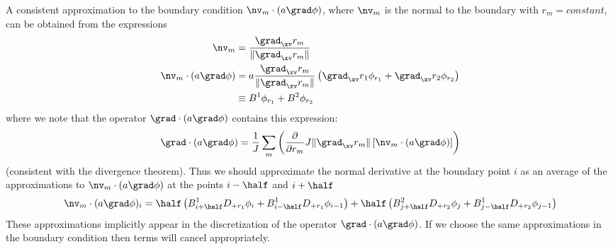 A consistent approximation to the boundary condition $\nv_m\cdot(a\grad \phi)$, where $\nv_m$ is
the normal to the boundary with  $r_m=constant$, can be obtained from the expressions
\begin{align*}
   \nv_m &= {\grad_\xv r_m \over \|\grad_\xv r_m \|} \\
   \nv_m\cdot(a\grad \phi) &= a {\grad_\xv r_m \over \|\grad_\xv r_m \|} 
        \left( \grad_\xv r_1 \phi_{r_1} + \grad_\xv r_2 \phi_{r_2} \right) \\
         &\equiv B^1 \phi_{r_1} + B^2 \phi_{r_2} 
\end{align*}
where we note that the operator $\grad\cdot( a \grad\phi) $ contains this expression:
\[
  \grad\cdot( a \grad\phi) = {1\over J} \sum_m \left(
         {\partial\over\partial r_m} J \|\grad_\xv r_m \| \left[ \nv_m\cdot(a\grad \phi) \right] \right)
\]
(consistent with the divergence theorem).
Thus we should approximate the normal derivative at the boundary point $i$ as an average
of the approximations to $\nv_m\cdot(a\grad \phi)$ at the points $i-\half$ and $i+\half$
\[
\nv_m\cdot(a\grad \phi)_i = \half\left( B^1_{i+\half} D_{+ r_1}\phi_i + B^1_{i-\half} D_{+ r_1}\phi_{i-1}\right) 
     + \half\left( B^2_{j+\half} D_{+ r_2}\phi_j + B^1_{j-\half} D_{+ r_2}\phi_{j-1}\right)
\]
These approximations implicitly appear in the discretization of the operator $\grad\cdot( a \grad\phi)$.
If we choose the same approximations in the boundary condition then terms will cancel appropriately.